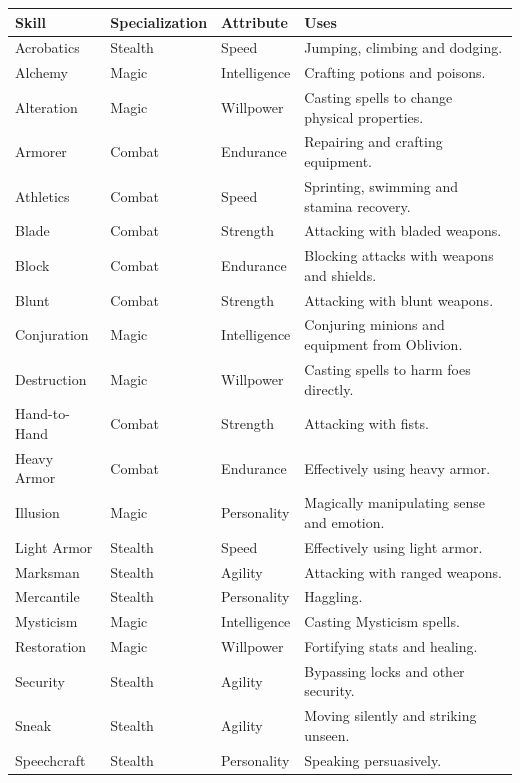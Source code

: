 \documentclass[12pt]{book}
\begin{document}
\begin{tabular}{p{}|p{}|p{}|p{}}

Skill & Specialization & Attribute & Uses\\ \hline
Acrobatics & Stealth & Speed & Jumping, climbing and dodging.\\ \hline
Alchemy & Magic & Intelligence & Crafting potions and poisons.\\ \hline
Alteration & Magic & Willpower & Casting spells to change physical properties.\\ \hline
Armorer & Combat & Endurance & Repairing and crafting equipment.\\ \hline
Athletics & Combat & Speed & Sprinting, swimming and stamina recovery.\\ \hline
Blade & Combat & Strength & Attacking with bladed weapons.\\ \hline
Block & Combat & Endurance & Blocking attacks with weapons and shields.\\ \hline
Blunt & Combat & Strength & Attacking with blunt weapons.\\ \hline
Conjuration & Magic & Intelligence & Conjuring minions and equipment from Oblivion.\\ \hline
Destruction & Magic & Willpower & Casting spells to harm foes directly.\\ \hline
Hand-to-Hand & Combat & Strength & Attacking with fists.\\ \hline
Heavy Armor & Combat & Endurance & Effectively using heavy armor.\\ \hline
Illusion & Magic & Personality & Magically manipulating sense and emotion.\\ \hline
Light Armor & Stealth & Speed & Effectively using light armor.\\ \hline
Marksman & Stealth & Agility & Attacking with ranged weapons.\\ \hline
Mercantile & Stealth & Personality & Haggling.\\ \hline
Mysticism & Magic & Intelligence & Casting Mysticism spells.\\ \hline
Restoration & Magic & Willpower & Fortifying stats and healing.\\ \hline
Security & Stealth & Agility & Bypassing locks and other security.\\ \hline
Sneak & Stealth & Agility & Moving silently and striking unseen.\\ \hline
Speechcraft & Stealth & Personality & Speaking persuasively.\\
\end{tabular}
\end{document}
